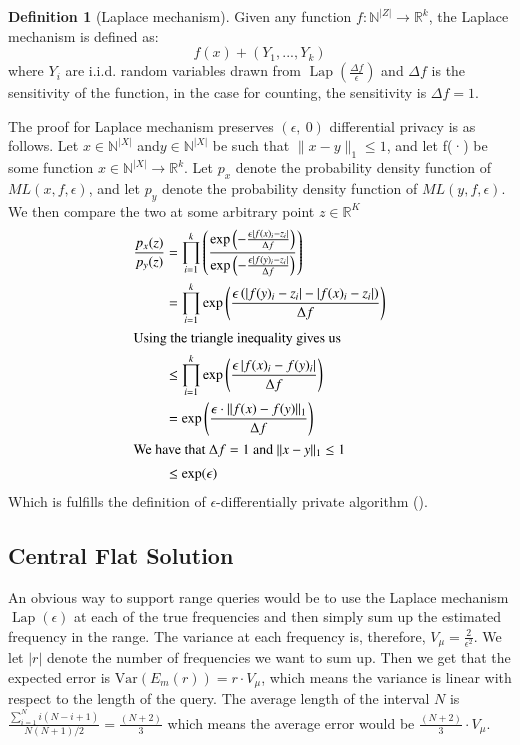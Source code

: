 \documentclass[11pt]{article}
\theoremstyle{definition}
\newtheorem{definition}{Definition}[section]
\begin{document}
\begin{definition}[Laplace mechanism]\label{lap}
Given any function $f:\mathbb{N}^{|Z|}\rightarrow \mathbb{R}^k$, the Laplace mechanism is defined as: \[f(x) + (Y_1,...,Y_k)\]
where $Y_i$ are i.i.d. random variables drawn from $\operatorname{Lap}(\frac{\Delta f}{\epsilon})$ and $\Delta f$ is the sensitivity of the function, in the case for counting, the sensitivity is $\Delta f=1$.
\end{definition}
The proof for Laplace mechanism preserves $(\epsilon, \ 0)$ differential privacy is as follows.
Let $x\in\mathbb{N}^{|X|}$ and$y\in\mathbb{N}^{|X|}$ be such that $\lVert x-y\rVert_1\leq 1$, and let f(·) be some function $x\in\mathbb{N}^{|X|}\rightarrow \mathbb{R}^{k}$. Let $p_x$ denote the probability density function of $ML(x,f,\epsilon)$, and let $p_y$ denote the probability density function of $ML(y,f,\epsilon)$. We then compare the two at some arbitrary point $z\in\mathbb{R}^{K}$
\begin{align*}
\frac{p_{x}(z)}{p_{y}(z)} &=\prod_{i=1}^{k}\left(\frac{\exp \left(-\frac{\epsilon\left|f(x)_{i}-z_{i}\right|}{\Delta f}\right)}{\exp \left(-\frac{\epsilon\left|f(y)_{i}-z_{i}\right|}{\Delta f}\right)}\right) \\
&=\prod_{i=1}^{k} \exp \left(\frac{\epsilon\left(\left|f(y)_{i}-z_{i}\right|-\left|f(x)_{i}-z_{i}\right|\right)}{\Delta f}\right) \\
\intertext{Using the triangle inequality gives us }
& \leq \prod_{i=1}^{k} \exp \left(\frac{\epsilon\left|f(x)_{i}-f(y)_{i}\right|}{\Delta f}\right) \\
&=\exp \left(\frac{\epsilon \cdot\|f(x)-f(y)\|_{1}}{\Delta f}\right) \\
\intertext{We have that $\Delta f = 1$ and $\lVert x-y\rVert_1\leq 1$  }
& \leq \exp (\epsilon) 
\end{align*}
Which is fulfills the definition of $\epsilon$-differentially private algorithm (\cite[23]{algo_fun}).



\subsection{Central Flat Solution}\label{teo_cen_flat}
An obvious way to support range queries would be to use the Laplace mechanism $\operatorname{Lap}(\epsilon)$ at each of the true frequencies and then simply sum up the estimated frequency in the range. The variance at each frequency is, therefore, $V_\mu=\frac{2}{\epsilon^2}$. We let $|r|$ denote the number of frequencies we want to sum up. Then we get that the expected error is $\mathrm{Var}(E_m (r))=r\cdot V_\mu$, which means the variance is linear with respect to the length of the query. The average length of the interval $N$ is $\frac{\sum_{i=1}^{N} i(N-i+1)}{N(N+1) / 2}=\frac{(N+2)}{3}$ which means the average error would be $\frac{(N+2)}{3}\cdot V_\mu$.
\end{document}
